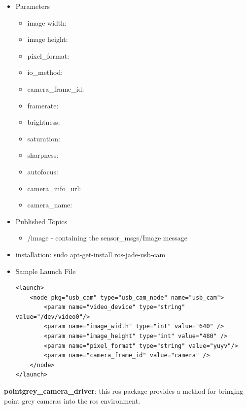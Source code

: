 \begin{itemize}
\item Parameters
\begin{itemize}
\item image width:
\item image height:
\item pixel\_format:
\item io\_method:
\item camera\_frame\_id:
\item framerate:
\item brightness:
\item saturation:
\item sharpness:
\item autofocus:
\item camera\_info\_url:
\item camera\_name:
\end{itemize}
\item Published Topics
\begin{itemize}
\item /image - containing the sensor\_msgs/Image message
\end{itemize}
\item installation: sudo apt-get-install ros-jade-usb-cam
\item Sample Launch File
\lstset{language=XML}
\begin{lstlisting}
<launch>
	<node pkg="usb_cam" type="usb_cam_node" name="usb_cam">
		<param name="video_device" type="string" value="/dev/video0"/>
		<param name="image_width" type="int" value="640" />
		<param name="image_height" type="int" value="480" />
		<param name="pixel_format" type="string" value="yuyv"/>
		<param name="camera_frame_id" value="camera" />
	</node>
</launch>
\end{lstlisting}
\end{itemize}



 
\noindent \textbf{pointgrey\_camera\_driver}: this ros package provides a method for bringing point grey cameras into the ros environment. 

